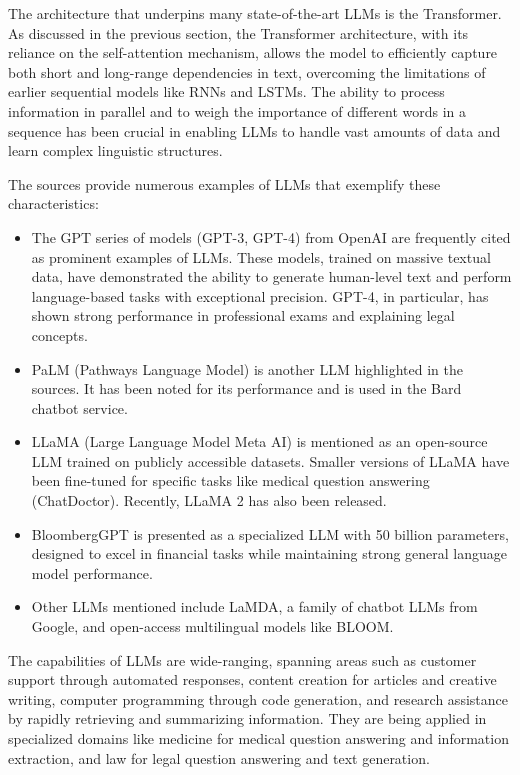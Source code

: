 The architecture that underpins many state-of-the-art LLMs is the Transformer. As discussed in the previous section, the Transformer architecture, with its reliance on the self-attention mechanism, allows the model to efficiently capture both short and long-range dependencies in text, overcoming the limitations of earlier sequential models like RNNs and LSTMs. The ability to process information in parallel and to weigh the importance of different words in a sequence has been crucial in enabling LLMs to handle vast amounts of data and learn complex linguistic structures.

The sources provide numerous examples of LLMs that exemplify these characteristics:

\begin{itemize}
    \item The GPT series of models (GPT-3, GPT-4) from OpenAI are frequently cited as prominent examples of LLMs. These models, trained on massive textual data, have demonstrated the ability to generate human-level text and perform language-based tasks with exceptional precision. GPT-4, in particular, has shown strong performance in professional exams and explaining legal concepts.
    \item PaLM (Pathways Language Model) is another LLM highlighted in the sources. It has been noted for its performance and is used in the Bard chatbot service.
    \item LLaMA (Large Language Model Meta AI) is mentioned as an open-source LLM trained on publicly accessible datasets. Smaller versions of LLaMA have been fine-tuned for specific tasks like medical question answering (ChatDoctor). Recently, LLaMA 2 has also been released.
    \item BloombergGPT is presented as a specialized LLM with 50 billion parameters, designed to excel in financial tasks while maintaining strong general language model performance.
    \item Other LLMs mentioned include LaMDA, a family of chatbot LLMs from Google, and open-access multilingual models like BLOOM.
\end{itemize}

The capabilities of LLMs are wide-ranging, spanning areas such as customer support through automated responses, content creation for articles and creative writing, computer programming through code generation, and research assistance by rapidly retrieving and summarizing information. They are being applied in specialized domains like medicine for medical question answering and information extraction, and law for legal question answering and text generation.

